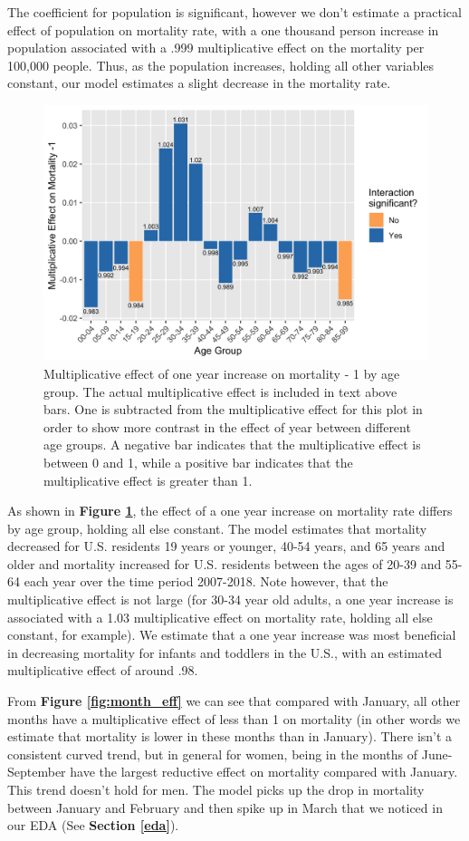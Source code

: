 \documentclass[letterpaper, 11pt]{article}
\begin{document}
The coefficient for population is significant, however we don't estimate a practical effect of population on mortality rate, with a one thousand person increase in population associated with a .999 multiplicative effect on the mortality per 100,000 people. Thus, as the population increases, holding all other variables constant, our model estimates a slight decrease in the mortality rate.

\begin{figure}[ht]
    \centering
   \includegraphics[width = .6\textwidth]{../figures/year_effect.png}
       \caption{Multiplicative effect of one year increase on mortality - 1 by age group. The actual multiplicative effect is included in text above bars. One is subtracted from the multiplicative effect for this plot in order to show more contrast in the effect of year between different age groups. A negative bar indicates that the multiplicative effect is between 0 and 1, while a positive bar indicates that the multiplicative effect is greater than 1.}
         \label{fig:year_eff}
\end{figure}

As shown in\textbf{ Figure \ref{fig:year_eff}}, the effect of a one year increase on mortality rate differs by age group, holding all else constant. The model estimates that mortality decreased for U.S. residents 19 years or younger, 40-54 years, and 65 years and older and mortality increased for U.S. residents between the ages of 20-39 and 55-64 each year over the time period 2007-2018. Note however, that the multiplicative effect is not large (for 30-34 year old adults, a one year increase is associated with a 1.03 multiplicative effect on mortality rate, holding all else constant, for example). We estimate that a one year increase was most beneficial in decreasing mortality for infants and toddlers in the U.S., with an estimated multiplicative effect of around .98.

From \textbf{Figure \ref{fig:month_eff}} we can see that compared with January, all other months have a multiplicative effect of less than 1 on mortality (in other words we estimate that mortality is lower in these months than in January). There isn't a consistent curved trend, but in general for women, being in the months of June-September have the largest reductive effect on mortality compared with January. This trend doesn't hold for men. The model picks up the drop in mortality between January and February and then spike up in March that we noticed in our EDA (See \textbf{Section \ref{eda}}).
\end{document}
